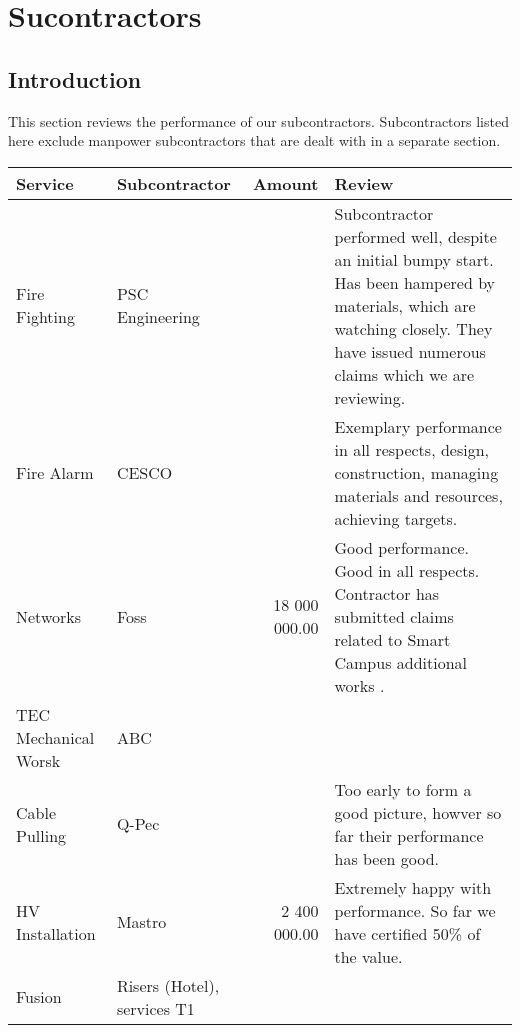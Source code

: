 \chapter{Sucontractors}

\section{Introduction}

This section reviews the performance of our subcontractors. Subcontractors listed here exclude manpower subcontractors that are dealt with in a separate section.



\begin{longtable}{p{3.0cm}l r p{6.0cm}}
\toprule
Service   & Subcontractor & Amount & Review\\
\midrule
Fire Fighting & PSC Engineering & & Subcontractor performed well, despite an initial bumpy start. Has been hampered by materials, which are watching closely. They have issued numerous claims which we are reviewing. \\
Fire Alarm & CESCO &&Exemplary performance in all respects, design, construction, managing materials and resources, achieving targets.\\
Networks &Foss& 18 000 000.00  &Good performance. Good in all respects. Contractor has submitted claims related to Smart Campus additional works  . \\
TEC Mechanical Worsk & ABC & & \\
Cable Pulling        & Q-Pec & & Too early to form a good picture, howver so far their performance has been good.\\
HV Installation      & Mastro &2 400 000.00 & Extremely happy with performance. So far we have certified 50\%                        of the value. \\
Fusion &Risers (Hotel), services T1  & & \\
\bottomrule
\end{longtable}